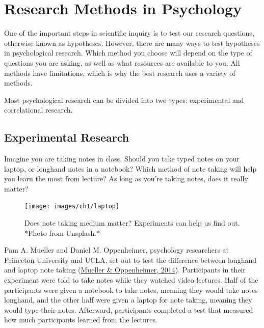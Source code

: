 \documentclass[
]{krantz}
\begin{document}
\hypertarget{research-methods-in-psychology}{%
\section{Research Methods in Psychology}\label{research-methods-in-psychology}}

One of the important steps in scientific inquiry is to test our research questions, otherwise known as hypotheses. However, there are many ways to test hypotheses in psychological research. Which method you choose will depend on the type of questions you are asking, as well as what resources are available to you. All methods have limitations, which is why the best research uses a variety of methods.

Most psychological research can be divided into two types: experimental and correlational research.

\hypertarget{experimental-research}{%
\subsection*{Experimental Research}\label{experimental-research}}


Imagine you are taking notes in class. Should you take typed notes on your laptop, or longhand notes in a notebook? Which method of note taking will help you learn the most from lecture? As long as you're taking notes, does it really matter?

\begin{figure}

{\centering \texttt{[image: images/ch1/laptop]} 

}

\caption{Does note taking medium matter? Experiments can help us find out. *Photo from Unsplash.*}\label{fig:laptop}
\end{figure}

Pam A. Mueller and Daniel M. Oppenheimer, psychology researchers at Princeton University and UCLA, set out to test the difference between longhand and laptop note taking (\protect\hyperlink{ref-mueller2014}{Mueller \& Oppenheimer, 2014}). Participants in their experiment were told to take notes while they watched video lectures. Half of the participants were given a notebook to take notes, meaning they would take notes longhand, and the other half were given a laptop for note taking, meaning they would type their notes. Afterward, participants completed a test that measured how much participants learned from the lectures.
\end{document}
